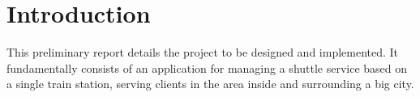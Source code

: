 \chapter{Introduction} \label{introduction}
This preliminary report details the project to be designed and implemented.
It fundamentally consists of an application for managing a shuttle service based on a single train station, serving clients in the area inside and surrounding a big city.
